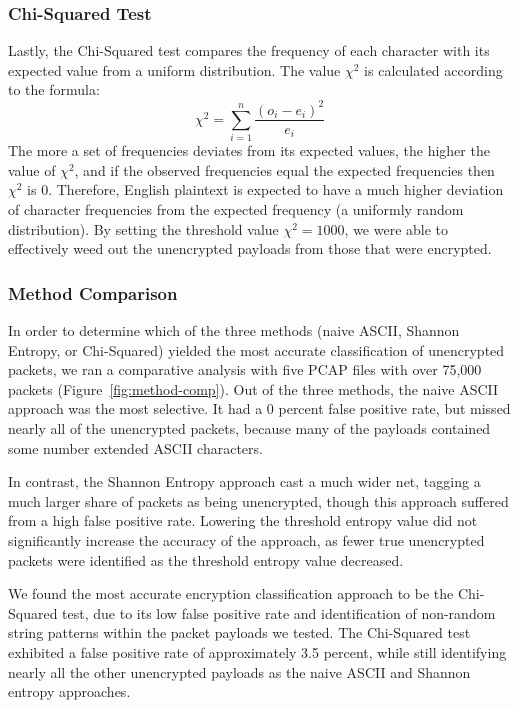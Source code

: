 \subsubsection{Chi-Squared Test}
Lastly, the Chi-Squared test compares the frequency of each character with its expected value from a uniform distribution. The value $\chi^2$ is calculated according to the formula:
$$\chi^2 = \sum_{i=1}^{n} \frac{(o_i-e_i)^2}{e_i}$$
The more a set of frequencies deviates from its expected values, the higher the value of $\chi^2$, and if the observed frequencies equal the expected frequencies then $\chi^2$ is 0. Therefore, English plaintext is expected to have a much higher deviation of character frequencies from the expected frequency (a uniformly random distribution). By setting the threshold value $\chi^2 = 1000$, we were able to effectively weed out the unencrypted payloads from those that were encrypted. 

\subsubsection{Method Comparison}
In order to determine which of the three methods (naive ASCII, Shannon Entropy, or Chi-Squared) yielded the most accurate classification of unencrypted packets, we ran a comparative analysis with five PCAP files with over 75,000 packets (Figure~\ref{fig:method-comp}). Out of the three methods, the naive ASCII approach was the most selective. It had a 0 percent false positive rate, but missed nearly all of the unencrypted packets, because many of the payloads contained some number extended ASCII characters. 

In contrast, the Shannon Entropy approach cast a much wider net, tagging a much larger share of packets as being unencrypted, though this approach suffered from a high false positive rate. Lowering the threshold entropy value did not significantly increase the accuracy of the approach, as fewer true unencrypted packets were identified as the threshold entropy value decreased. 

We found the most accurate encryption classification approach to be the Chi-Squared test, due to its low false positive rate and identification of non-random string patterns within the packet payloads we tested. The Chi-Squared test exhibited a false positive rate of approximately 3.5 percent, while still identifying nearly all the other unencrypted payloads as the naive ASCII and Shannon entropy approaches.



